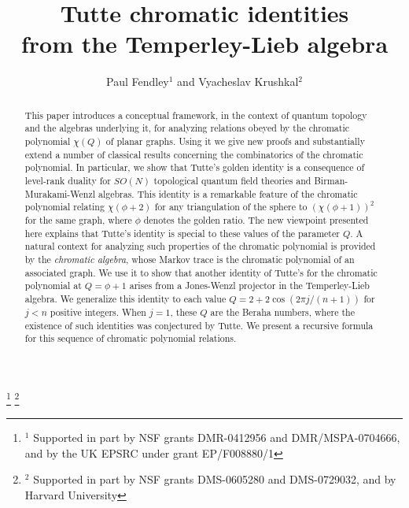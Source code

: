\documentclass[11pt]{amsart}
\numberwithin{equation}{section}
\theoremstyle{definition}
\begin{document}
\title[Tutte chromatic identities from the Temperley-Lieb algebra]
{Tutte chromatic identities\\ from the Temperley-Lieb algebra}

\author[Paul Fendley and Vyacheslav Krushkal]{Paul Fendley$^1$ and Vyacheslav Krushkal$^2$}
\address{Paul Fendley, Department of Physics, University of Virginia,
Charlottesville, VA 22904 USA;
and All Souls College and the Rudolf Peierls Centre for Theoretical Physics,
University of Oxford, 1 Keble Road, Oxford OX13NP, UK
}


\address{Vyacheslav Krushkal, Department of Mathematics, University of Virginia,
Charlottesville, VA 22904-4137 USA}



\thanks{$^1$ Supported in part by NSF grants DMR-0412956 and DMR/MSPA-0704666, and by the UK EPSRC under grant EP/F008880/1}
\thanks{$^2$ Supported in part by NSF grants DMS-0605280 and DMS-0729032, and by Harvard University}


\begin{abstract}
This paper introduces a conceptual framework, in the context of quantum topology
and the algebras underlying it, for analyzing relations
obeyed by the chromatic polynomial $\chi(Q)$ of planar graphs.
Using it we give new proofs and substantially extend a number of classical
results concerning the combinatorics of the chromatic polynomial.
In particular, we show that
Tutte's golden identity is a consequence of level-rank
duality for $SO(N)$ topological quantum field theories and
Birman-Murakami-Wenzl algebras. This identity is a remarkable feature of the chromatic
polynomial relating
$\chi({\phi+2})$ for any triangulation of the sphere to
$(\chi({\phi+1}))^2$ for the same graph, where ${\phi}$ denotes the
golden ratio. The new viewpoint presented here explains that Tutte's identity
is special to these values of the parameter $Q$.
A natural context for analyzing such properties of the
chromatic polynomial is provided by the {\em chromatic algebra},
whose Markov trace is the chromatic polynomial of an associated
graph.  We use it to show that another identity of
Tutte's for the chromatic polynomial at $Q={\phi}+1$ arises from a
Jones-Wenzl projector in the Temperley-Lieb algebra. We generalize
this identity to each value $Q= 2+2\cos(2\pi j/(n+1))$ for $j< n$
positive integers.  When $j=1$, these $Q$ are the Beraha numbers,
where the existence of such identities was conjectured by Tutte.  We
present a recursive formula for this sequence of chromatic polynomial
relations.
\end{abstract}
\end{document}
